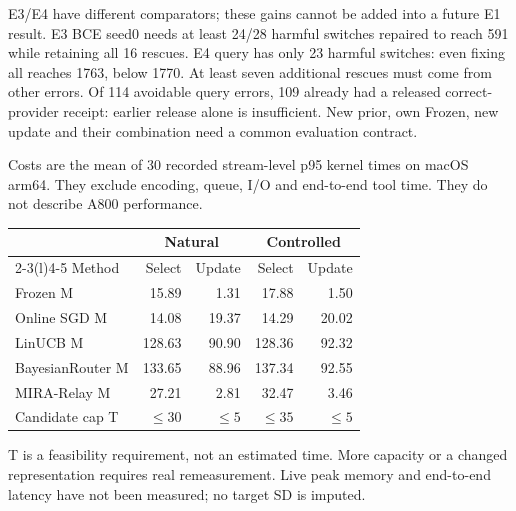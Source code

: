 \documentclass[10pt,letterpaper]{article}
\newcommand{\B}[1]{{\color{GuideBlue}#1}}
\newcommand{\note}[1]{{\fontsize{8.5}{10.5}\selectfont #1\par}}
\newcommand{\sect}[1]{\vspace{5pt}{\large\bfseries #1}\par\vspace{2pt}}
\newenvironment{clean}{\begin{center}\fontsize{9.5}{11.5}\selectfont\setlength{\tabcolsep}{6pt}\renewcommand{\arraystretch}{1.06}}{\end{center}}
\begin{document}
\note{E3/E4 have different comparators; these gains cannot be added into a future E1 result. E3 BCE seed0 needs at least 24/28 harmful switches repaired to reach 591 while retaining all 16 rescues. E4 query has only 23 harmful switches: even fixing all reaches 1763, below 1770. At least seven additional rescues must come from other errors. Of 114 avoidable query errors, 109 already had a released correct-provider receipt: earlier release alone is insufficient. New prior, own Frozen, new update and their combination need a common evaluation contract.}
\newpage
\sect{E5 / body Table 7: matched cost and feasibility}
Costs are the mean of 30 recorded stream-level p95 kernel times on macOS arm64.
They exclude encoding, queue, I/O and end-to-end tool time. They do not describe A800 performance.
\par\noindent\begin{minipage}{\linewidth}\end{minipage}\par
\begin{clean}\begin{tabular}{@{}lrrrr@{}}
\toprule
& \multicolumn{2}{c}{Natural} & \multicolumn{2}{c}{Controlled} \\ \cmidrule(lr){2-3}\cmidrule(l){4-5} Method & Select & Update & Select & Update \\
\midrule
Frozen M & 15.89 & 1.31 & 17.88 & 1.50 \\
Online SGD M & 14.08 & 19.37 & 14.29 & 20.02 \\
LinUCB M & 128.63 & 90.90 & 128.36 & 92.32 \\
BayesianRouter M & 133.65 & 88.96 & 137.34 & 92.55 \\
MIRA-Relay M & 27.21 & 2.81 & 32.47 & 3.46 \\
\B{Candidate cap T} & \B{$\leq30$} & \B{$\leq5$} & \B{$\leq35$} & \B{$\leq5$} \\
\bottomrule\end{tabular}\end{clean}
\note{T is a feasibility requirement, not an estimated time. More capacity or a changed representation requires real remeasurement. Live peak memory and end-to-end latency have not been measured; no target SD is imputed.}
\sect{E6 / body Table 8: coverage must match within each fitted policy}
\par\noindent\begin{minipage}{\linewidth}\end{minipage}\par
\end{document}
